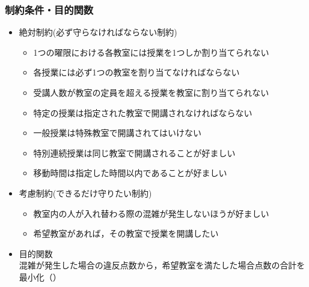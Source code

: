 \documentclass[dvipdfmx,12pt]{beamer}
\begin{document}
\begin{frame}\frametitle{制約条件・目的関数}
\begin{itemize}
\item 絶対制約(必ず守らなければならない制約)
\begin{itemize}
\item 1つの曜限における各教室には授業を1つしか割り当てられない
\item 各授業には必ず1つの教室を割り当てなければならない
\item 受講人数が教室の定員を超える授業を教室に割り当てられない
\item 特定の授業は指定された教室で開講されなければならない
\item 一般授業は特殊教室で開講されてはいけない
\item 特別連続授業は同じ教室で開講されることが好ましい
\item 移動時間は指定した時間以内であることが好ましい
\end{itemize}


\item 考慮制約(できるだけ守りたい制約)

\begin{itemize}
\item 教室内の人が入れ替わる際の混雑が発生しないほうが好ましい
\item 希望教室があれば，その教室で授業を開講したい
\end{itemize}
\item 目的関数\\
混雑が発生した場合の違反点数から，希望教室を満たした場合点数の合計を最小化（）
\end{itemize}
\end{frame}
\end{document}
